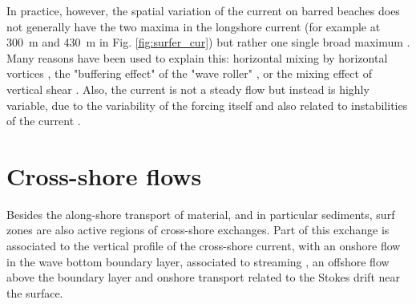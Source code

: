In practice, however, the spatial variation of the current on barred beaches does not generally have the two maxima in the longshore current (for example at 300~m and 430~m in Fig. \ref{fig:surfer_cur}) but rather one single broad maximum \citep{Reniers&Battjes1997}. Many reasons have been used to explain this: horizontal mixing by horizontal vortices \citep{Church&Thornton1993,Brocchini&al.2004}, the "buffering effect" of the "wave roller" \citep{Lippmann&al.1996}, or the mixing effect of vertical shear \citep{Putrevu&Svendsen1999}.  Also, the current is not a steady flow but instead is highly variable, due to the variability of the forcing itself and also related to instabilities of the current \citep{Oltman-Shay&al.1989}.



\section{Cross-shore flows}
Besides the along-shore transport of material, and in particular sediments, surf zones are also active regions of cross-shore exchanges. Part of this exchange is associated to the vertical profile of the cross-shore current, with an onshore flow in the wave bottom boundary layer, associated to streaming \citep{Longuet-Higgins1953}, an offshore flow above the boundary layer and onshore transport related to the Stokes drift near the surface.  

